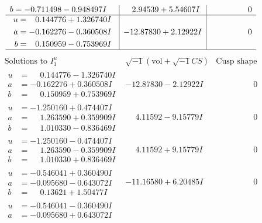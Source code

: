 \documentclass[1p]{elsarticle_modified}
\theoremstyle{definition}
\newcommand{\I}{\sqrt{-1}}
\begin{document}
$$\begin{array}{c|c|c}
\begin{aligned}
b &= -0.711498 - 0.948497 I\end{aligned}
 & \phantom{-}2.94539 + 5.54607 I & \phantom{-0.000000 } 0 \\ \hline\begin{aligned}
u &= \phantom{-}0.144776 + 1.326740 I \\
a &= -0.162276 - 0.360508 I \\
b &= \phantom{-}0.150959 - 0.753969 I\end{aligned}
 & -12.87830 + 2.12922 I & \phantom{-0.000000 } 0\\
 \hline 
 \end{array}$$\newpage$$\begin{array}{c|c|c}  
\text{Solutions to }I^u_{1}& \I (\text{vol} + \sqrt{-1}CS) & \text{Cusp shape}\\
 \hline 
\begin{aligned}
u &= \phantom{-}0.144776 - 1.326740 I \\
a &= -0.162276 + 0.360508 I \\
b &= \phantom{-}0.150959 + 0.753969 I\end{aligned}
 & -12.87830 - 2.12922 I & \phantom{-0.000000 } 0 \\ \hline\begin{aligned}
u &= -1.250160 + 0.474407 I \\
a &= \phantom{-}1.263590 + 0.359909 I \\
b &= \phantom{-}1.010330 - 0.836469 I\end{aligned}
 & \phantom{-}4.11592 - 9.15779 I & \phantom{-0.000000 } 0 \\ \hline\begin{aligned}
u &= -1.250160 - 0.474407 I \\
a &= \phantom{-}1.263590 - 0.359909 I \\
b &= \phantom{-}1.010330 + 0.836469 I\end{aligned}
 & \phantom{-}4.11592 + 9.15779 I & \phantom{-0.000000 } 0 \\ \hline\begin{aligned}
u &= -0.546041 + 0.360490 I \\
a &= -0.095680 - 0.643072 I \\
b &= \phantom{-}0.13621 + 1.50477 I\end{aligned}
 & -11.16580 + 6.20485 I & \phantom{-0.000000 } 0 \\ \hline\begin{aligned}
u &= -0.546041 - 0.360490 I \\
a &= -0.095680 + 0.643072 I \\

\end{aligned}
\end{array}$$
\end{document}
